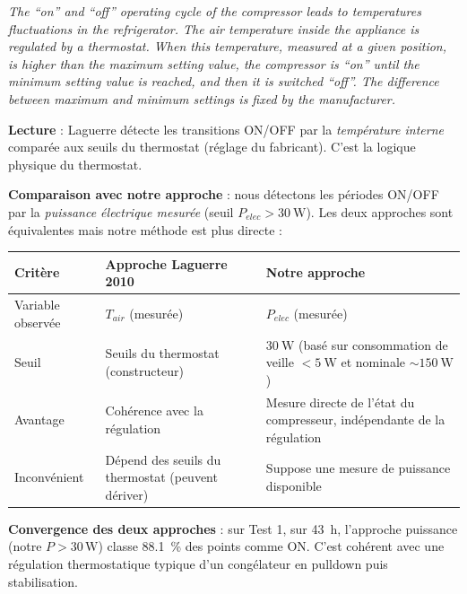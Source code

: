 \documentclass[11pt,a4paper]{article}
\begin{document}
\begin{tcolorbox}[breakable,enhanced jigsaw,colback=yellow!10,colframe=yellow!50!black,boxrule=0.4pt,arc=2pt]
\og{} \emph{The ``on'' and ``off'' operating cycle of the compressor leads to
temperatures fluctuations in the refrigerator. The air temperature inside the appliance is
regulated by a thermostat. When this temperature, measured at a given position, is higher
than the maximum setting value, the compressor is ``on'' until the minimum setting
value is reached, and then it is switched ``off''. The difference between maximum
and minimum settings is fixed by the manufacturer.} \fg{}
\end{tcolorbox}

\textbf{Lecture} : Laguerre détecte les transitions ON/OFF par la \emph{température
interne} comparée aux seuils du thermostat (réglage du fabricant). C'est la logique
\og physique \fg{} du thermostat.

\textbf{Comparaison avec notre approche} : nous détectons les périodes ON/OFF par la
\emph{puissance électrique mesurée} (seuil $P_{elec} > \SI{30}{\watt}$). Les deux approches
sont équivalentes mais notre méthode est plus directe :

\begin{center}
\renewcommand{\arraystretch}{1.3}
\begin{tabular}{p{4cm}p{5cm}p{5cm}}
\toprule
\textbf{Critère} & \textbf{Approche Laguerre 2010} & \textbf{Notre approche} \\
\midrule
Variable observée & $T_{air}$ (mesurée) & $P_{elec}$ (mesurée) \\
Seuil & Seuils du thermostat (constructeur) & $\SI{30}{\watt}$ (basé sur consommation
de veille $<\SI{5}{\watt}$ et nominale $\sim\SI{150}{\watt}$) \\
Avantage & Cohérence avec la régulation & Mesure directe de l'état du compresseur,
indépendante de la régulation \\
Inconvénient & Dépend des seuils du thermostat (peuvent dériver) & Suppose une mesure de
puissance disponible \\
\bottomrule
\end{tabular}
\end{center}

\textbf{Convergence des deux approches} : sur Test 1, sur \SI{43}{\hour}, l'approche \og
puissance \fg{} (notre $P > 30\,\si{\watt}$) classe \SI{88,1}{\percent} des points comme
ON. C'est cohérent avec une régulation thermostatique typique d'un congélateur en
pulldown puis stabilisation.
\end{document}
